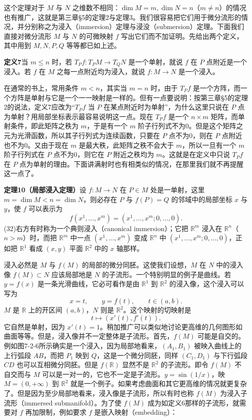 这个定理对于 $M$ 与 $N$ 之维数不相同：$\dim M=m,\dim N=n$（$m\ne n$）的情况也有推广，这就是第三章§5的定理2与定理3。我们很容易把它们用于微分流形的情况，并分别称之为浸入（immersion）定理与浸没（submersion）定理。下面我们直接对微分流形 $M$ 与 $N$ 的可微映射 $f$ 写出它们而不加证明。先给出两个定义，其中用到 $M,N,P,Q$ 等等都已如上述。

\noindent\textbf{定义7}\quad 当 $m\le n$ 时，若 $T_Pf:T_PM\to T_QN$ 是一个单射，就说 $f$ 在 $P$ 点附近是一个浸入。若 $f$ 在 $M$ 之每一点附近均为浸入，就说 $f:M\to N$ 是一个浸入。

在通常的书上，常用条件 $m<n$，其实当 $m=n$ 时，由于 $T_Pf$ 是一个方阵，而一个方阵是单射与它是一个一一映射是一样的。但有一点要说明：按第三章§5的定理2的说法，定义7应改为“$T_Pf$ 当 $P$ 在某点附近时为单射”，为什么这里只说在 $P$ 点为单射？用局部坐标表示最容易说明这一点。现在 $T_Pf$ 是一个 $n\times m$ 矩阵，而单射条件，即此矩阵之秩为 $m$，于是有一个 $m$ 阶子行列式不为0。但是这个矩阵之元为光滑函数，所以其子行列式为连续函数，只要在 $P$ 点不为0，则在 $P$ 点附近也不为0。又由于现在 $m$ 是最大秩，此矩阵之秩不会大于 $m$，所以一旦有一个 $m$ 阶子行列式在 $P$ 点不为0，则它在 $P$ 附近之秩均为 $m$。这就是在定义中只说 $T_Pf$ 在 $P$ 点为单射的理由。下面讲满射时也有相类似的情况，在那里我们就不再提醒这一点了。

\noindent\textbf{定理10（局部浸入定理）}\quad 设 $f:M\to N$ 在 $P\in M$ 处是一单射，这里 $m=\dim M<n=\dim N$，则必存在 $P$ 与 $f(P)=Q$ 的邻域中的局部坐标 $x$ 与 $y$，使 $f$ 可以表示为
\begin{equation}
 f(x^1,\ldots,x^m)=(x^1,\ldots,x^m;0,\ldots,0).
 \tag{32}
\end{equation}
(32)右方有时称为一个典则浸入（canonical immersion）；它把 $\mathbb R^m$ 浸入在 $\mathbb R^n$（$n>m$）时，而把 $\mathbb R^m$ 中一点 $(x^1,\ldots,x^m)$ 变成 $\mathbb R^n$ 中 $(x^1,\ldots,x^m;0,\ldots,0)$，正如把 $\mathbb R^1$ 看成 $(x,y)$ 平面 $\mathbb R^2$ 中的 $x$ 轴那样。

浸入必然是 $M$ 与 $f(M)$ 的局部的微分同胚。这使我们设想，$M$ 在 $N$ 中的浸入像 $f(M)\subset N$ 应该局部地是 $N$ 的子流形。一个特别明显的例子是曲线。若 $y=f(x)$ 是一条光滑曲线，它必可看作是由 $\mathbb R^1$ 到 $\mathbb R^2$ 的浸入像，这个浸入可以写为
\[
 x=t,\qquad y=f(t),\qquad t\in(a,b).
\]
$M$ 是 $\mathbb R$ 上的开区间 $(a,b)$，$N$ 则是 $\mathbb R^2$。这个映射的切映射是
\[
 t\longmapsto(x'(t),f'(t)).
\]
它自然是单射，因为 $x'(t)=1$。稍加推广可以类似地讨论更高维的几何图形如曲面等等。但是，浸入像并不一定整体是子流形。首先，$f(M)$ 可能是自交的。例如图7-2-6所示确实是一个浸入，因为局部地看来，$(A_1,B_1)$ 被映入曲线上的上行弧段 $AB$，而把 $P_1$ 映到 $Q$，这是一个微分同胚，同样 $(C_1,D_1)$ 与下行弧段 $CD$ 也可以互相微分同胚。但是 $f(\mathbb R)$ 显然不是 $\mathbb R^2$ 的子流形。即令 $f(M)$ 不自交而与 $M$ 可以是一对一的，它也不一定是子流形。$y=\sin(1/x)$，映 $M=(0,+\infty)$ 到 $\mathbb R^2$ 就是一个例子。如果考虑曲面和其它更高维的情况就更复杂了。但是因为至少局部地看来，浸入像是子流形，所以有时也称 $f(M)$ 为浸入子流形（immersed submanifold）。为了使 $f(M)$ 成为如定义6那样的子流形，就需要对 $f$ 再加限制，例如要求 $f$ 是嵌入映射（embedding）：

